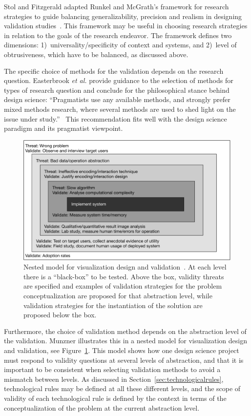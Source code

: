 \documentclass[graybox]{svmult}
\begin{document}
Stol and Fitzgerald adapted Runkel and McGrath's framework for research strategies to guide balancing generalizability, precision and realism in designing validation studies~\cite{StolABC18}. This framework may be useful in choosing research strategies in relation to the goals of the research endeavor. The framework defines two dimensions: 1)~universality/specificity of context and systems, and 2)~level of obtrusiveness, which have to be balanced, as discussed above. 

The specific choice of methods for the validation depends on the research question. Easterbrook \emph{et al.} provide guidance to the selection of methods for types of research question and conclude for the philosophical stance behind design science: ``Pragmatists use any available methods, and strongly prefer mixed methods research, where several methods are used to shed light on the issue under study.''~\cite{easterbrook_selecting_2008} 
This recommendation fits well with the design science paradigm and its pragmatist viewpoint.

\begin{figure}[t]
  \includegraphics[width=\textwidth]{Figures/nested_model.pdf}
\caption{Nested model for visualization design and validation~\cite{munzner2009}. At each level there is a ``black-box'' to be tested. Above the box, validity threats are specified and examples of validation strategies for the problem conceptualization are proposed for that abstraction level, while validation strategies for the instantiation of the solution are proposed below the box.}\label{fig:nested_model}       
\end{figure} 

Furthermore, the choice of validation method depends on the abstraction level of the validation. Munzner illustrates this in a nested model for visualization design and validation, see Figure~\ref{fig:nested_model}. This model shows how one design science project must respond to validity questions at several levels of abstraction, and that it is important to be consistent when selecting validation methods to avoid a mismatch between levels. As discussed in Section~\ref{sec:technologicalrules}, technological rules may be defined at all these different levels, and the scope of validity of each technological rule is defined by the context in terms of the conceptualization of the problem at the current abstraction level.
\end{document}
